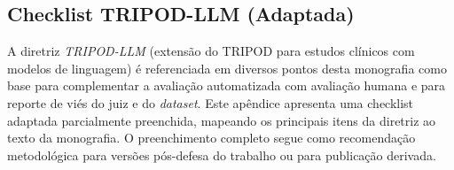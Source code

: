 \documentclass[
  12pt,
  oneside,
  a4paper,
  english,
  brazil
]{abntex2}
\begin{document}
\begin{apendicesenv}
\chapter{Checklist TRIPOD-LLM (Adaptada)}
\label{ape:tripod}

A diretriz \textit{TRIPOD-LLM} \cite{gallifant2025tripod} (extensão do
TRIPOD para estudos clínicos com modelos de linguagem) é referenciada em
diversos pontos desta monografia como base para complementar a avaliação
automatizada com avaliação humana e para reporte de viés do juiz e do
\textit{dataset}. Este apêndice apresenta uma checklist adaptada
parcialmente preenchida, mapeando os principais itens da diretriz ao
texto da monografia. O preenchimento completo segue como recomendação
metodológica para versões pós-defesa do trabalho ou para publicação
derivada.

\bigskip


\end{apendicesenv}
\end{document}
